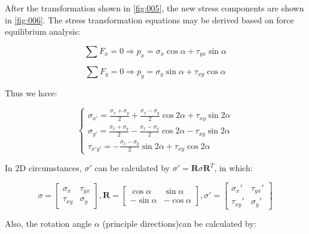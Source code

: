 \documentclass[en,hazy,cyan,8pt,normal]{elegantnote}
\begin{document}
    After the transformation shown in \cref{fig:005}, the new stress components are shown in \cref{fig:006}.
    The stress transformation equations may be derived based on force equilibrium analysis:

    \begin{equation}\label{eq:008}
      \sum F_x=0\Rightarrow p_x=\sigma_x\cos\alpha+\tau_{yx}\sin\alpha
    \end{equation}

    \begin{equation}\label{eq:009}
      \sum F_y=0\Rightarrow p_y=\sigma_y\sin\alpha+\tau_{xy}\cos\alpha
    \end{equation}

    Thus we have:

    \begin{equation}\label{eq:010}
      \begin{cases}
        \displaystyle \sigma_{x'}=\frac{\sigma_x+\sigma_y}{2}+\frac{\sigma_x-\sigma_y}{2}\cos2\alpha+\tau_{xy}\sin2\alpha\\
        \displaystyle \sigma_{y'}=\frac{\sigma_x+\sigma_y}{2}-\frac{\sigma_x-\sigma_y}{2}\cos2\alpha-\tau_{xy}\sin2\alpha\\
        \displaystyle \tau_{x'y'}=-\frac{\sigma_x-\sigma_y}{2}\sin2\alpha+\tau_{xy}\cos2\alpha
      \end{cases}
    \end{equation}

    In 2D circumstances, $\sigma'$ can be calculated by $\sigma'=\mathbf{R}\sigma \mathbf{R}^T$, in which:

    \begin{equation}\label{eq:011}
      \sigma=
      \begin{bmatrix}
        \sigma_x & \tau_{yx}\\
        \tau_{xy} & \sigma_y
      \end{bmatrix}, 
      \mathbf{R}=
      \begin{bmatrix}
        \cos\alpha & \sin\alpha\\
        -\sin\alpha & -\cos\alpha
      \end{bmatrix},
      \sigma'=
      \begin{bmatrix}
        \sigma_x' & \tau_{yx}'\\
        \tau_{xy}' & \sigma_y'
      \end{bmatrix}
    \end{equation}

    Also, the rotation angle $\alpha$ (principle directions)can be calculated by:
\end{document}
